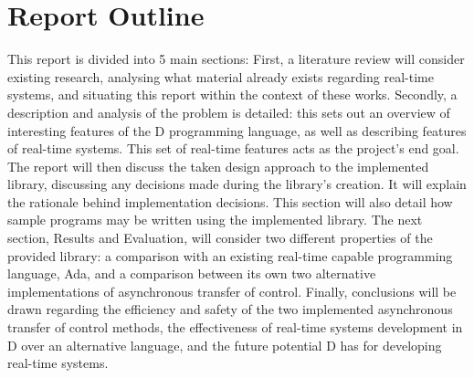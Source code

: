 \section{Report Outline} %
This report is divided into 5 main sections:
First, a literature review will 
consider existing research, analysing what material already exists regarding 
real-time systems, and situating this report within the context of these works. 
Secondly, a description and analysis of the problem is detailed: this sets out      %
an overview of interesting features of the D programming language, as well as 
describing features of real-time systems. This set of real-time features acts as 
the project's end goal. 
The report will then discuss the taken design approach to the implemented library,
discussing any decisions made during the library's creation. It will explain the 
rationale behind implementation decisions. This section will also detail 
how sample programs may be written using the implemented library. 
The next section, Results and Evaluation, will consider two different properties 
of the provided library: a comparison with an existing real-time capable programming 
language, Ada, and a comparison between its own two alternative implementations 
of asynchronous transfer of control. 
Finally, conclusions will be drawn regarding the efficiency and safety of the 
two implemented asynchronous transfer of control methods, the effectiveness of 
real-time systems development in D over an alternative language, and the future 
potential D has for developing real-time systems.
